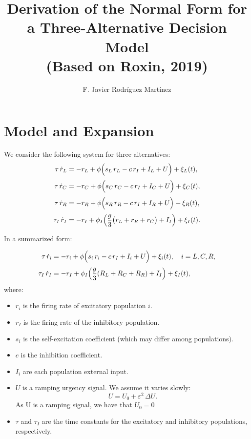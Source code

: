 \documentclass[ENG]{fancynotes}
\title{\vspace{2em}Derivation of the Normal Form for a Three-Alternative Decision Model\\ (Based on Roxin, 2019) }
\author{F. Javier Rodríguez Martínez}
\date{}
\begin{document}
\maketitle

\section{Model and Expansion}

We consider the following system for three alternatives:
\begin{align}
  \tau\,\dot{r}_L &= -r_L + \phi\Bigl(s_L\,r_L - c\,r_I + I_L + U\Bigr) +\xi_L(t) ,  \label{eq:rL}\\[1mm]
  \tau\,\dot{r}_C &= -r_C + \phi\Bigl(s_C\,r_C - c\,r_I + I_C + U\Bigr)+\xi_C(t), \label{eq:rC}\\[1mm]
  \tau\,\dot{r}_R &= -r_R + \phi\Bigl(s_R\,r_R - c\,r_I + I_R + U\Bigr)+\xi_R(t), \label{eq:rR}\\[1mm]
  \tau_I\,\dot{r}_I &= -r_I + \phi_I\Bigl(\frac{g}{3}\bigl(r_L+r_R+r_C\bigr)+I_I\Bigr)+\xi_I(t). \label{eq:rI}
\end{align}

In a summarized form:

\begin{align}
  \tau\,\dot{r}_i &= -r_i + \phi\Bigl(s_i\,r_i - c\,r_I + I_i + U\Bigr)+\xi_i(t), \quad i=L,C,R, \label{eq:exc}\\[1mm]
  \tau_I\,\dot{r}_I &= -r_I + \phi_I\Bigl(\frac{g}{3}(R_L+R_C+R_R)+I_I\Bigr)+\xi_I(t), \label{eq:inh}
\end{align}
where:
\begin{itemize}
  \item \(r_i\) is the firing rate of excitatory population \(i\).
  \item \(r_I\) is the firing rate of the inhibitory population.
  \item \(s_i\) is the self-excitation coefficient (which may differ among populations).
  \item \(c\) is the inhibition coefficient.
  \item \(I_i\) are each population external input.
  \item \(U\) is a ramping urgency signal. We assume it varies slowly:
    \[
    U = U_0 + \varepsilon^2\,\Delta U.
    \]
	As U is a ramping signal, we have that $U_0 = 0$
  \item \(\tau\) and \(\tau_I\) are the time constants for the excitatory and inhibitory populations, respectively.
\end{itemize}
\end{document}
